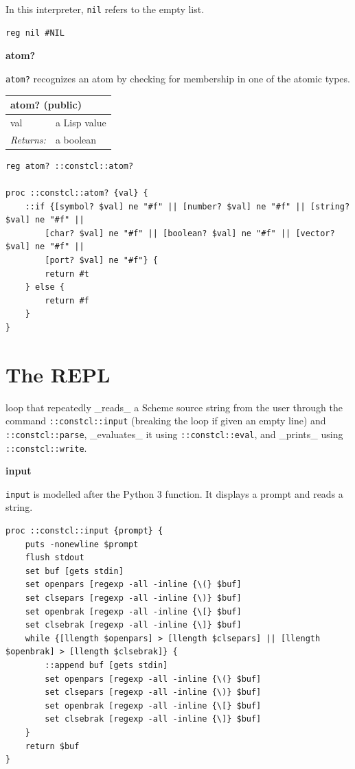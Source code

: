 \documentclass[twoside,9pt]{report}
\begin{document}
In this interpreter, \texttt{nil} refers to the empty list.

\noindent\makebox[\linewidth]{\rule{\linewidth}{0.4pt}}
\begin{lstlisting}
reg nil #NIL
\end{lstlisting}
\noindent\makebox[\linewidth]{\rule{\linewidth}{0.4pt}}

\textbf{atom?}


\texttt{atom?} recognizes an atom by checking for membership in one of the atomic types.

\begin{tabular}{ |l l| }
\hline
\multicolumn{2}{|l|}{atom? (public)} \\
\hline
val & a Lisp value \\
\textit{Returns:} & a boolean \\
\hline
\end{tabular}

\noindent\makebox[\linewidth]{\rule{\linewidth}{0.4pt}}
\begin{lstlisting}
reg atom? ::constcl::atom?
 
proc ::constcl::atom? {val} {
    ::if {[symbol? $val] ne "#f" || [number? $val] ne "#f" || [string? $val] ne "#f" ||
        [char? $val] ne "#f" || [boolean? $val] ne "#f" || [vector? $val] ne "#f" ||
        [port? $val] ne "#f"} {
        return #t
    } else {
        return #f
    }
}
\end{lstlisting}
\noindent\makebox[\linewidth]{\rule{\linewidth}{0.4pt}}
\section{The REPL}
\label{the-repl}

loop that repeatedly \_reads\_ a Scheme source string from the user through the command \texttt{::constcl::input} (breaking the loop if given an empty line) and \texttt{::constcl::parse}, \_evaluates\_ it using \texttt{::constcl::eval}, and \_prints\_ using \texttt{::constcl::write}.


\textbf{input}


\texttt{input} is modelled after the Python 3 function. It displays a prompt and reads a string.

\noindent\makebox[\linewidth]{\rule{\linewidth}{0.4pt}}
\begin{lstlisting}
proc ::constcl::input {prompt} {
    puts -nonewline $prompt
    flush stdout
    set buf [gets stdin]
    set openpars [regexp -all -inline {\(} $buf]
    set clsepars [regexp -all -inline {\)} $buf]
    set openbrak [regexp -all -inline {\[} $buf]
    set clsebrak [regexp -all -inline {\]} $buf]
    while {[llength $openpars] > [llength $clsepars] || [llength $openbrak] > [llength $clsebrak]} {
        ::append buf [gets stdin]
        set openpars [regexp -all -inline {\(} $buf]
        set clsepars [regexp -all -inline {\)} $buf]
        set openbrak [regexp -all -inline {\[} $buf]
        set clsebrak [regexp -all -inline {\]} $buf]
    }
    return $buf
}
\end{lstlisting}
\noindent\makebox[\linewidth]{\rule{\linewidth}{0.4pt}}
\end{document}
